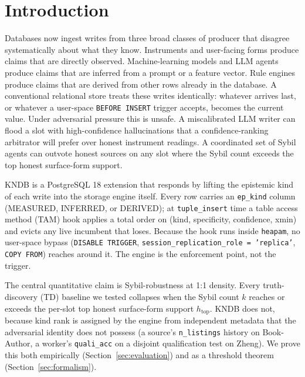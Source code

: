 \documentclass[sigconf, nonacm]{acmart}
\newcommand\vldbpagestyle{plain}
\begin{document}
\maketitle

\pagestyle{\vldbpagestyle}

\section{Introduction}

Databases now ingest writes from three broad classes of producer that disagree systematically about what they know. Instruments and user-facing forms produce claims that are directly observed. Machine-learning models and LLM agents produce claims that are inferred from a prompt or a feature vector. Rule engines produce claims that are derived from other rows already in the database. A conventional relational store treats these writes identically: whatever arrives last, or whatever a user-space \texttt{BEFORE INSERT} trigger accepts, becomes the current value. Under adversarial pressure this is unsafe. A miscalibrated LLM writer can flood a slot with high-confidence hallucinations that a confidence-ranking arbitrator will prefer over honest instrument readings. A coordinated set of Sybil agents can outvote honest sources on any slot where the Sybil count exceeds the top honest surface-form support.

KNDB is a PostgreSQL 18 extension that responds by lifting the epistemic kind of each write into the storage engine itself. Every row carries an \texttt{ep\_kind} column (MEASURED, INFERRED, or DERIVED); at \texttt{tuple\_insert} time a table access method (TAM) hook applies a total order on (kind, specificity, confidence, xmin) and evicts any live incumbent that loses. Because the hook runs inside \texttt{heapam}, no user-space bypass (\texttt{DISABLE TRIGGER}, \texttt{session\_replication\_role = 'replica'}, \texttt{COPY FROM}) reaches around it. The engine is the enforcement point, not the trigger.

The central quantitative claim is Sybil-robustness at 1:1 density. Every truth-discovery (TD) baseline we tested collapses when the Sybil count $k$ reaches or exceeds the per-slot top honest surface-form support $h_{\text{top}}$. KNDB does not, because kind rank is assigned by the engine from independent metadata that the adversarial identity does not possess (a source's \texttt{n\_listings} history on Book-Author, a worker's \texttt{quali\_acc} on a disjoint qualification test on Zheng). We prove this both empirically (Section~\ref{sec:evaluation}) and as a threshold theorem (Section~\ref{sec:formalism}).
\end{document}
